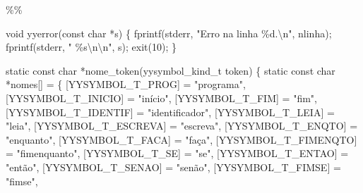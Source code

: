 \documentclass[
  brazilian,
  letterpaper,
]{book}
\newenvironment{Shaded}{\begin{snugshade}}{\end{snugshade}}
\newcommand{\DataTypeTok}[1]{\textcolor[rgb]{0.68,0.00,0.00}{#1}}
\newcommand{\DecValTok}[1]{\textcolor[rgb]{0.68,0.00,0.00}{#1}}
\newcommand{\NormalTok}[1]{\textcolor[rgb]{0.00,0.23,0.31}{#1}}
\newcommand{\OperatorTok}[1]{\textcolor[rgb]{0.37,0.37,0.37}{#1}}
\newcommand{\SpecialCharTok}[1]{\textcolor[rgb]{0.37,0.37,0.37}{#1}}
\newcommand{\StringTok}[1]{\textcolor[rgb]{0.13,0.47,0.30}{#1}}
\theoremstyle{plain}
\theoremstyle{definition}
\theoremstyle{remark}
\begin{document}
\begin{Shaded}
\begin{Highlighting}[]
\OperatorTok{\%\%}

\DataTypeTok{void}\NormalTok{ yyerror}\OperatorTok{(}\DataTypeTok{const} \DataTypeTok{char} \OperatorTok{*}\NormalTok{s}\OperatorTok{)}
\OperatorTok{\{}
\NormalTok{    fprintf}\OperatorTok{(}\NormalTok{stderr}\OperatorTok{,} \StringTok{"Erro na linha }\SpecialCharTok{\%d}\StringTok{.}\SpecialCharTok{\textbackslash{}n}\StringTok{"}\OperatorTok{,}\NormalTok{ nlinha}\OperatorTok{);}
\NormalTok{    fprintf}\OperatorTok{(}\NormalTok{stderr}\OperatorTok{,} \StringTok{"  }\SpecialCharTok{\%s\textbackslash{}n\textbackslash{}n}\StringTok{"}\OperatorTok{,}\NormalTok{ s}\OperatorTok{);}
\NormalTok{    exit}\OperatorTok{(}\DecValTok{10}\OperatorTok{);}
\OperatorTok{\}}

\DataTypeTok{static} \DataTypeTok{const} \DataTypeTok{char} \OperatorTok{*}\NormalTok{nome\_token}\OperatorTok{(}\NormalTok{yysymbol\_kind\_t token}\OperatorTok{)}
\OperatorTok{\{}
    \DataTypeTok{static} \DataTypeTok{const} \DataTypeTok{char} \OperatorTok{*}\NormalTok{nomes}\OperatorTok{[]} \OperatorTok{=} \OperatorTok{\{}
        \OperatorTok{[}\NormalTok{YYSYMBOL\_T\_PROG}\OperatorTok{]}      \OperatorTok{=} \StringTok{"programa"}\OperatorTok{,}
        \OperatorTok{[}\NormalTok{YYSYMBOL\_T\_INICIO}\OperatorTok{]}    \OperatorTok{=} \StringTok{"início"}\OperatorTok{,}
        \OperatorTok{[}\NormalTok{YYSYMBOL\_T\_FIM}\OperatorTok{]}       \OperatorTok{=} \StringTok{"fim"}\OperatorTok{,}
        \OperatorTok{[}\NormalTok{YYSYMBOL\_T\_IDENTIF}\OperatorTok{]}   \OperatorTok{=} \StringTok{"identificador"}\OperatorTok{,}
        \OperatorTok{[}\NormalTok{YYSYMBOL\_T\_LEIA}\OperatorTok{]}      \OperatorTok{=} \StringTok{"leia"}\OperatorTok{,}
        \OperatorTok{[}\NormalTok{YYSYMBOL\_T\_ESCREVA}\OperatorTok{]}   \OperatorTok{=} \StringTok{"escreva"}\OperatorTok{,}
        \OperatorTok{[}\NormalTok{YYSYMBOL\_T\_ENQTO}\OperatorTok{]}     \OperatorTok{=} \StringTok{"enquanto"}\OperatorTok{,}
        \OperatorTok{[}\NormalTok{YYSYMBOL\_T\_FACA}\OperatorTok{]}      \OperatorTok{=} \StringTok{"faça"}\OperatorTok{,}
        \OperatorTok{[}\NormalTok{YYSYMBOL\_T\_FIMENQTO}\OperatorTok{]}  \OperatorTok{=} \StringTok{"fimenquanto"}\OperatorTok{,}
        \OperatorTok{[}\NormalTok{YYSYMBOL\_T\_SE}\OperatorTok{]}        \OperatorTok{=} \StringTok{"se"}\OperatorTok{,}
        \OperatorTok{[}\NormalTok{YYSYMBOL\_T\_ENTAO}\OperatorTok{]}     \OperatorTok{=} \StringTok{"então"}\OperatorTok{,}
        \OperatorTok{[}\NormalTok{YYSYMBOL\_T\_SENAO}\OperatorTok{]}     \OperatorTok{=} \StringTok{"senão"}\OperatorTok{,}
        \OperatorTok{[}\NormalTok{YYSYMBOL\_T\_FIMSE}\OperatorTok{]}     \OperatorTok{=} \StringTok{"fimse"}\OperatorTok{,}

\end{Highlighting}
\end{Shaded}
\end{document}
